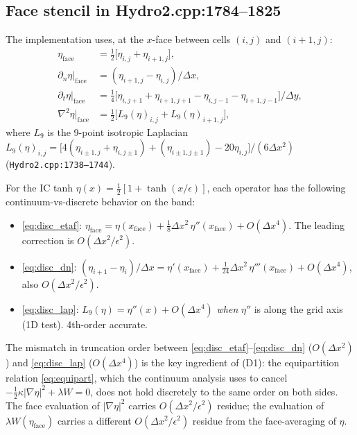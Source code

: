 \documentclass[11pt]{article}
\newcommand{\grad}{\nabla}
\newcommand{\dxn}{\partial_n}
\begin{document}
\subsection{Face stencil in Hydro2.cpp:1784--1825}

The implementation uses, at the $x$-face between cells $(i,j)$ and
$(i+1,j)$:
\begin{align}
\eta_{\mathrm{face}}
   &= \tfrac12\big[\eta_{i,j} + \eta_{i+1,j}\big], \label{eq:disc_etaf}\\
\dxn\eta\big|_{\mathrm{face}}
   &= (\eta_{i+1,j} - \eta_{i,j}) / \Delta x, \label{eq:disc_dn}\\
\partial_t\eta\big|_{\mathrm{face}}
   &= \tfrac14\big[\eta_{i,j+1}+\eta_{i+1,j+1}-\eta_{i,j-1}-\eta_{i+1,j-1}\big]/\Delta y,
   \label{eq:disc_dt}\\
\grad^2\eta\big|_{\mathrm{face}}
   &= \tfrac12\big[L_9(\eta)_{i,j} + L_9(\eta)_{i+1,j}\big], \label{eq:disc_lap}
\end{align}
where $L_9$ is the 9-point isotropic Laplacian
$L_9(\eta)_{i,j} = \big[4(\eta_{i\pm1,j}+\eta_{i,j\pm1}) + (\eta_{i\pm1,j\pm1}) - 20\eta_{i,j}\big] / (6\Delta x^2)$
(\texttt{Hydro2.cpp:1738--1744}).

For the IC tanh $\eta(x)=\tfrac12[1+\tanh(x/\epsilon)]$, each operator
has the following continuum-vs-discrete behavior on the band:
\begin{itemize}
\item \eqref{eq:disc_etaf}: $\eta_{\mathrm{face}} = \eta(x_{\mathrm{face}}) + \tfrac18\Delta x^2\,\eta''(x_{\mathrm{face}}) + O(\Delta x^4)$. The leading correction is $O(\Delta x^2/\epsilon^2)$.
\item \eqref{eq:disc_dn}: $(\eta_{i+1}-\eta_i)/\Delta x = \eta'(x_{\mathrm{face}}) + \tfrac{1}{24}\Delta x^2\,\eta'''(x_{\mathrm{face}}) + O(\Delta x^4)$, also $O(\Delta x^2/\epsilon^2)$.
\item \eqref{eq:disc_lap}: $L_9(\eta) = \eta''(x) + O(\Delta x^4)$ \emph{when} $\eta''$ is along the grid axis (1D test). 4th-order accurate.
\end{itemize}

The mismatch in truncation order between \eqref{eq:disc_etaf}--\eqref{eq:disc_dn}
($O(\Delta x^2)$) and \eqref{eq:disc_lap} ($O(\Delta x^4)$) is the key
ingredient of (D1): the equipartition relation \eqref{eq:equipart}, which
the continuum analysis uses to cancel
$-\tfrac12\kappa|\grad\eta|^2 + \lambda W = 0$, does not hold discretely
to the same order on both sides. The face evaluation of $|\grad\eta|^2$
carries $O(\Delta x^2/\epsilon^2)$ residue; the evaluation of
$\lambda W(\eta_{\mathrm{face}})$ carries a different $O(\Delta x^2/\epsilon^2)$
residue from the face-averaging of $\eta$.
\end{document}
